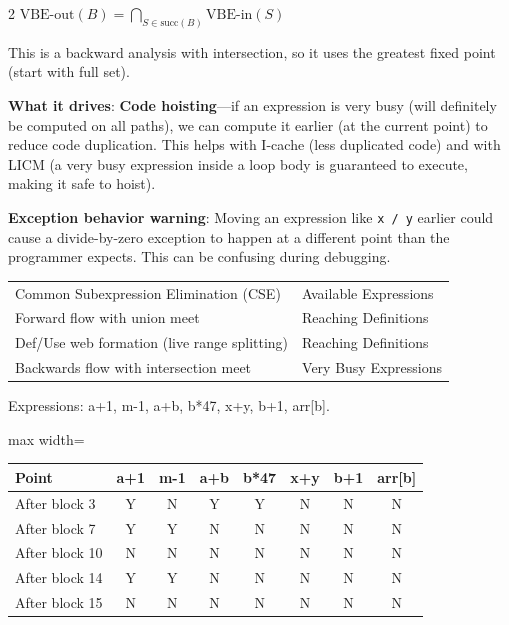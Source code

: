 \documentclass[9pt,landscape]{extarticle}
\begin{document}
\begin{multicols}{2}
$\text{VBE-out}(B) = \displaystyle\bigcap_{S \in \text{succ}(B)} \text{VBE-in}(S)$

This is a backward analysis with intersection, so it uses the greatest fixed point (start with full set).

\textbf{What it drives}: \textbf{Code hoisting}---if an expression is very busy (will definitely be computed on all paths), we can compute it earlier (at the current point) to reduce code duplication. This helps with I-cache (less duplicated code) and with LICM (a very busy expression inside a loop body is guaranteed to execute, making it safe to hoist).

\textbf{Exception behavior warning}: Moving an expression like \texttt{x / y} earlier could cause a divide-by-zero exception to happen at a different point than the programmer expects. This can be confusing during debugging.

\begin{exambox}
\begin{tabular}{@{}ll@{}}
Common Subexpression Elimination (CSE) & Available Expressions \\
Forward flow with union meet & Reaching Definitions \\
Def/Use web formation (live range splitting) & Reaching Definitions \\
Backwards flow with intersection meet & Very Busy Expressions \\
\end{tabular}
\end{exambox}

\begin{exambox}
Expressions: a+1, m-1, a+b, b*47, x+y, b+1, arr[b].

\begin{adjustbox}{max width=\linewidth}
\begin{tabular}{@{}lccccccc@{}}
\toprule
Point & a+1 & m-1 & a+b & b*47 & x+y & b+1 & arr[b] \\
\midrule
After block 3 & Y & N & Y & Y & N & N & N \\
After block 7 & Y & Y & N & N & N & N & N \\
After block 10 & N & N & N & N & N & N & N \\
After block 14 & Y & Y & N & N & N & N & N \\
After block 15 & N & N & N & N & N & N & N \\
\bottomrule
\end{tabular}
\end{adjustbox}


\end{exambox}
\end{multicols}
\end{document}
